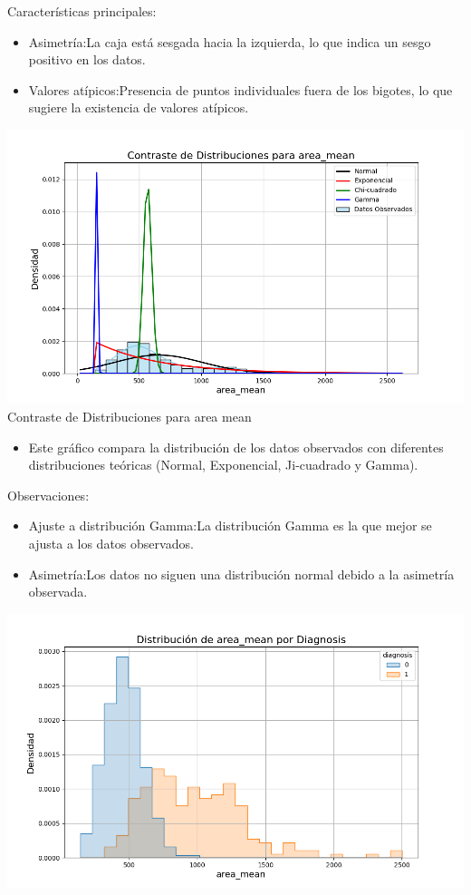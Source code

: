 \documentclass[a4paper, 12pt]{article}
\begin{document}
Características principales:

\begin{itemize}
\item Asimetría:La caja está sesgada hacia la izquierda, lo que indica un sesgo positivo en los datos.
\item Valores atípicos:Presencia de puntos individuales fuera de los bigotes, lo que sugiere la existencia de valores atípicos.
\end{itemize}

\includegraphics[width=\textwidth]{../Plots/plots_stats/area_mean/distribuciones_conocidas_area_mean.png}
Contraste de Distribuciones para area mean

\begin{itemize}
\item Este gráfico compara la distribución de los datos observados con diferentes distribuciones teóricas (Normal, Exponencial, Ji-cuadrado y Gamma).
\end{itemize}

Observaciones:

\begin{itemize}
\item Ajuste a distribución Gamma:La distribución Gamma es la que mejor se ajusta a los datos observados.
\item Asimetría:Los datos no siguen una distribución normal debido a la asimetría observada.
\end{itemize}

\includegraphics[width=\textwidth]{../Plots/plots_diagnosis/distribucion_area_mean_por_diagnosis.png}
\end{document}
